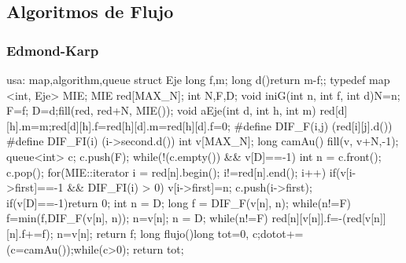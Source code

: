 \documentclass[10pt,landscape,twocolumn,a4paper,notitlepage]{article}
\begin{document}
\subsection{Algoritmos de Flujo}
\subsubsection{Edmond-Karp}\begin{code}
usa: map,algorithm,queue
struct Eje{ long f,m; long d(){return m-f;}};
typedef map <int, Eje> MIE; MIE red[MAX_N];
int N,F,D;
void iniG(int n, int f, int d){N=n; F=f; D=d;fill(red, red+N, MIE());}
void aEje(int d, int h, int m){
  red[d][h].m=m;red[d][h].f=red[h][d].m=red[h][d].f=0;
}
#define DIF_F(i,j) (red[i][j].d())
#define DIF_FI(i)  (i->second.d())
int v[MAX_N];
long camAu(){
  fill(v, v+N,-1);
  queue<int> c;
  c.push(F);
  while(!(c.empty()) && v[D]==-1){
    int n = c.front(); c.pop();
    for(MIE::iterator i = red[n].begin(); i!=red[n].end(); i++){
      if(v[i->first]==-1 && DIF_FI(i) > 0){
        v[i->first]=n;
        c.push(i->first);
      }
    }
  }
  if(v[D]==-1)return 0;
  int n = D;
  long f = DIF_F(v[n], n);
  while(n!=F){
    f=min(f,DIF_F(v[n], n));
    n=v[n];
  }
  n = D;
  while(n!=F){
    red[n][v[n]].f=-(red[v[n]][n].f+=f);
    n=v[n];
  }
  return f;
}
long flujo(){long tot=0, c;do{tot+=(c=camAu());}while(c>0); return tot;}
\end{code}
\end{document}
